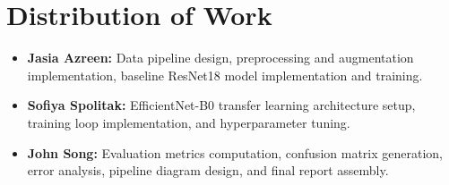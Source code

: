 \documentclass{article}
\begin{document}
\section*{Distribution of Work}
\begin{itemize}
    \item \textbf{Jasia Azreen:} Data pipeline design, preprocessing and augmentation
          implementation, baseline ResNet18 model implementation and training.
    \item \textbf{Sofiya Spolitak:} EfficientNet-B0 transfer learning architecture setup,
          training loop implementation, and hyperparameter tuning.
    \item \textbf{John Song:} Evaluation metrics computation, confusion matrix
          generation, error analysis, pipeline diagram design, and final report assembly.
\end{itemize}



\end{document}
